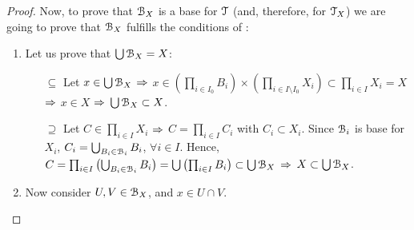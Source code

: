 \begin{proof}
	Now, to prove that $\EuScript{B}_X$ is a base for $\EuScript{T}$ (and, therefore, for $\EuScript{T}_X$) we are going to prove that $\EuScript{B}_X$ fulfills
	the conditions of :
	\begin{enumerate}
		\item Let us prove that $\bigcup\EuScript{B}_X = X$:
		\begin{itemize}
			\item[$\boxed{\subseteq}$] Let $x\in \bigcup\EuScript{B}_X$ $\Rightarrow$ $x\in \left(\prod_{i\in I_0} B_i\right)\times\left(\prod_{i\in I\setminus I_0}X_i\right)\subset\prod_{i\in I} X_i = X$ $\Rightarrow$ $x\in X$ $\Rightarrow$ $\bigcup \EuScript{B}_X\subset X$.
			\item[$\boxed{\supseteq}$] Let $C\in \prod_{i\in I}X_i$ $\Rightarrow$ $C=\prod_{i\in I}C_i$ with $C_i\subset X_i$.
			Since $\EuScript{B}_i$ is base for $X_i$, $C_i=\bigcup_{B_i\in \EuScript{B}_i} B_i$, $\forall i\in I$.
			Hence, $C=\prod_{i\in I}\left(\bigcup_{B_i\in \EuScript{B}_i} B_i\right) = \bigcup \left(\prod_{i\in I} B_i\right) \subset \bigcup \EuScript{B}_X$ $\Rightarrow$ $X\subset \bigcup \EuScript{B}_X$.
		\end{itemize}
		\item Now consider $U,V\in \EuScript{B}_X$, and $x\in U\cap V$.
	\end{enumerate}
\end{proof}